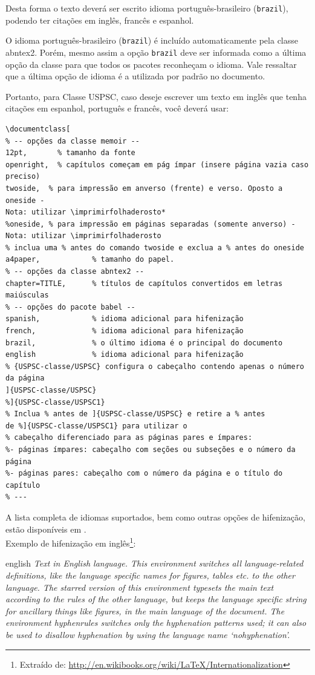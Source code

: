 Desta forma o texto deverá ser escrito idioma português-brasileiro (\texttt{brazil}), podendo ter citações em inglês, francês e espanhol.

O idioma português-brasileiro (\texttt{brazil}) é incluído automaticamente pela
classe \textsf{abntex2}. Porém, mesmo assim a opção \texttt{brazil} deve ser
informada como a última opção da classe para que todos os pacotes reconheçam o
idioma. Vale ressaltar que a última opção de idioma é a utilizada por padrão no
documento. 

Portanto, para Classe USPSC, caso deseje escrever um texto em inglês que tenha
citações em espanhol, português e francês, você deverá usar:

\begin{verbatim}
\documentclass[
% -- opções da classe memoir --
12pt,		% tamanho da fonte
openright,	% capítulos começam em pág ímpar (insere página vazia caso 
preciso)
twoside,  % para impressão em anverso (frente) e verso. Oposto a oneside - 
Nota: utilizar \imprimirfolhaderosto*
%oneside, % para impressão em páginas separadas (somente anverso) -  
Nota: utilizar \imprimirfolhaderosto
% inclua uma % antes do comando twoside e exclua a % antes do oneside 
a4paper,			% tamanho do papel. 
% -- opções da classe abntex2 --
chapter=TITLE,		% títulos de capítulos convertidos em letras 
maiúsculas
% -- opções do pacote babel --
spanish,			% idioma adicional para hifenização
french,				% idioma adicional para hifenização
brazil,				% o último idioma é o principal do documento
english 			% idioma adicional para hifenização
% {USPSC-classe/USPSC} configura o cabeçalho contendo apenas o número 
da página
]{USPSC-classe/USPSC}
%]{USPSC-classe/USPSC1}
% Inclua % antes de ]{USPSC-classe/USPSC} e retire a % antes 
de %]{USPSC-classe/USPSC1} para utilizar o 
% cabeçalho diferenciado para as páginas pares e ímpares:
%- páginas ímpares: cabeçalho com seções ou subseções e o número da página
%- páginas pares: cabeçalho com o número da página e o título do capítulo 
% ---
\end{verbatim}

A lista completa de idiomas suportados, bem como outras opções de hifenização,
estão disponíveis em . \\

Exemplo de hifenização em inglês\footnote{Extraído de:
	\url{http://en.wikibooks.org/wiki/LaTeX/Internationalization}}:

\begin{otherlanguage*}{english}
	\textit{Text in English language. This environment switches all language-related
		definitions, like the language specific names for figures, tables etc. to the other
		language. The starred version of this environment typesets the main text
		according to the rules of the other language, but keeps the language specific
		string for ancillary things like figures, in the main language of the document.
		The environment hyphenrules switches only the hyphenation patterns used; it can
		also be used to disallow hyphenation by using the language name
		`nohyphenation'.}
\end{otherlanguage*}

